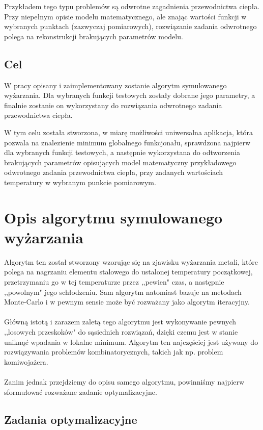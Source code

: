\documentclass[twoside]{projektInzynierskiMS1}
\newcommand{\newLine}{~\\}
\newcommand{\si}{ś}
\begin{document}
Przykładem tego typu problemów są odwrotne zagadnienia przewodnictwa ciepła. Przy niepełnym opisie modelu matematycznego, ale znając warto\si ci funkcji w wybranych punktach (zazwyczaj pomiarowych), rozwiązanie zadania odwrotnego polega na rekonstrukcji brakujących parametrów modelu. 

\subsection{Cel}

W pracy opisany i zaimplementowany zostanie algorytm symulowanego wyżarzania. Dla wybranych funkcji testowych zostały dobrane jego parametry, a finalnie zostanie on wykorzystany do rozwiązania odwrotnego zadania przewodnictwa ciepła.

W tym celu została stworzona, w miarę możliwo\si ci uniwersalna aplikacja, która pozwala na znalezienie minimum globalnego funkcjonału, sprawdzona najpierw dla wybranych funkcji testowych, a następnie wykorzystana do odtworzenia brakujących parametrów opisujących model matematyczny przykładowego odwrotnego zadania przewodnictwa ciepła, przy zadanych warto\si ciach temperatury w wybranym punkcie pomiarowym.


\section{Opis algorytmu symulowanego wyżarzania}
				Algorytm ten został stworzony wzorując się na zjawisku wyżarzania metali, które polega na nagrzaniu elementu stalowego do ustalonej temperatury początkowej, przetrzymaniu go w tej temperaturze przez ,,pewien" czas, a następnie ,,powolnym" jego schłodzeniu. Sam algorytm natomiast bazuje na metodach Monte-Carlo i w pewnym sensie może być rozważany jako algorytm iteracyjny.\\ \newLine
Główną istotą i zarazem zaletą tego algorytmu jest wykonywanie pewnych ,,losowych przeskoków" do sąsiednich rozwiązań, dzięki czemu jest w stanie uniknąć wpadania w lokalne minimum. Algorytm ten najczę\si ciej jest używany do rozwiązywania problemów kombinatorycznych, takich jak np. problem komiwojażera. \\ \newLine

Zanim jednak przejdziemy do opisu samego algorytmu, powinni\si my najpierw sformułować rozważane zadanie optymalizacyjne.

\subsection{Zadania optymalizacyjne}
\end{document}
